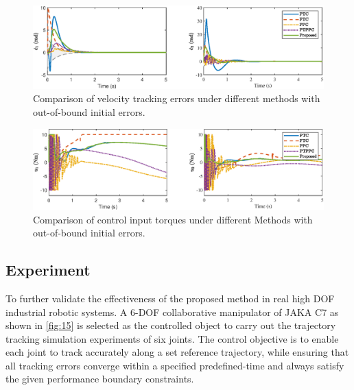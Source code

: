 \documentclass[pdflatex,sn-mathphys-num]{sn-jnl}%
\theoremstyle{thmstyleone}%
\theoremstyle{thmstyletwo}%
\theoremstyle{thmstylethree}%
\begin{document}
\begin{figure}[H]
	\centering
	\includegraphics[width=0.9\linewidth]{fig13.eps}
	\caption{Comparison of velocity tracking errors under different methods with out-of-bound initial errors.}
	\label{fig:13}
\end{figure}

\begin{figure}[H]
	\centering
	\includegraphics[width=0.9\linewidth]{fig14.eps}
	\caption{Comparison of control input torques under different Methods with out-of-bound initial errors.}
	\label{fig:14}
\end{figure}



\subsection{Experiment}

To further validate the effectiveness of the proposed method in real high DOF industrial robotic systems. A 6-DOF collaborative manipulator of JAKA C7 as shown in \cref{fig:15} is selected as the controlled object to carry out the trajectory tracking simulation experiments of six joints. The control objective is to enable each joint to track accurately along a set reference trajectory, while ensuring that all tracking errors converge within a specified predefined-time and always satisfy the given performance boundary constraints.
\end{document}
